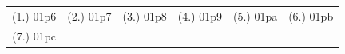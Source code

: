 \begin{eocexercises}{}
\begin{enumerate}
\end{enumerate}

\par \practiceinfo
\par \begin{tabular}[h]{cccccc}
(1.)	01p6	&
(2.)	01p7	&
(3.)	01p8	&
(4.)	01p9	&
(5.)	01pa	&
(6.)	01pb	\\ %
(7.)	01pc	&
\end{tabular}

\end{eocexercises}









